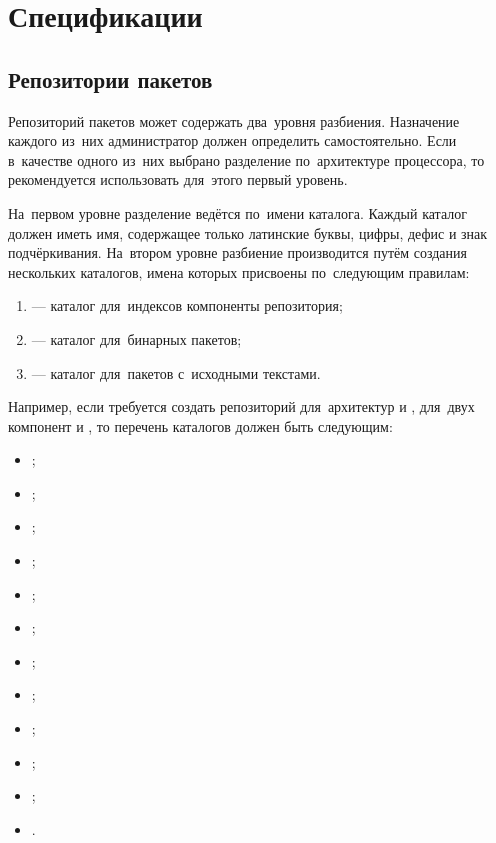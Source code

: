 
\section{Спецификации}

\subsection{Репозитории пакетов}
\label{repo_format}

Репозиторий пакетов \ds может содержать два~уровня разбиения.
Назначение каждого из~них администратор должен определить самостоятельно.
Если в~качестве одного из~них выбрано разделение по~архитектуре процессора, то рекомендуется использовать для~этого первый уровень.

На~первом уровне разделение ведётся по~имени каталога. 
Каждый каталог должен иметь имя, содержащее только латинские буквы, цифры, дефис и знак подчёркивания.
На~втором уровне разбиение производится путём создания нескольких каталогов,
имена которых присвоены по~следующим правилам:

\begin{enumerate}  

\item {
 --- каталог для~индексов компоненты репозитория;
}

\item {
 --- каталог для~бинарных пакетов;
}

\item {
 --- каталог для~пакетов с~исходными текстами.
}

\end{enumerate}

Например, если требуется создать репозиторий для~архитектур  и , 
для~двух компонент  и ,
то перечень каталогов должен быть следующим:

\begin{itemize}

\item{;}
\item{;}
\item{;}
\item{;}
\item{;}
\item{;}
\item{;}
\item{;}
\item{;}
\item{;}
\item{;}
\item{.}

\end{itemize}
